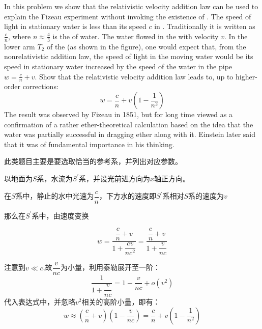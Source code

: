 \chapter[狭义相对论]{}
\begin{solution}
    In this problem we show that the relativistic velocity addition law can be used to
    explain the Fizeau experiment without invoking the existence of . The speed of light in stationary water is less than its speed $c$ in .
    Traditionally it is written as $\frac{c}{n}$, where $n\approx \frac{4}{3}$ is the  of water. The water flowed in the  with
    velocity $v$. In the lower arm $T_2$ of the  (as shown in the figure), one would expect that, from the nonrelativistic addition law, the
    speed of light in the moving water would be its speed in stationary
    water increased by the speed of the water in the pipe $w=\frac{c}{n}+v$. Show
    that the relativistic velocity addition law leads to, up to higher-order
    corrections:
    \begin{equation*}
        w=\frac cn+v\left(1-\frac1{n^2}\right)
    \end{equation*}
    The result was observed by Fizeau in 1851, but for long time viewed as
    a confirmation of a rather   ether-theoretical
    calculation based on the idea that the water was partially successful in
    dragging ether along with it. Einstein later said that it was of
    fundamental importance in his thinking.
    \begin{center}
    \end{center}

    \tcbrule

    此类题目主要是要选取恰当的参考系，并列出对应参数。

    以地面为$S$系，水流为$S^{\prime}$系，并设光前进方向为$x$轴正方向。

    在$S$系中，静止的水中光速为$\dfrac{c}{n}$，下方水的速度即$S^{\prime}$系相对$S$系的速度为$v$

    那么在$S^{\prime}$系中，由速度变换

    \[w=\dfrac{\dfrac{c}{n}+v}{1+\dfrac{cv}{nc^{2}}}=\dfrac{\dfrac{c}{n}+v}{1+\dfrac{v}{nc}}\]

    注意到$v\ll c$,故$\dfrac{v}{nc}$为小量，利用泰勒展开至一阶：
    \begin{equation*}
        \dfrac{1}{1+\dfrac{v}{nc}} = 1 - \dfrac{v}{nc} + o\left(v^{2}\right)
    \end{equation*}
    代入表达式中，并忽略$v^{2}$相关的高阶小量，即有：
    \[w\approx(\frac{c}{n}+v)(1-\frac{v}{nc})=\frac{c}{n}+v(1-\frac{1}{n^{2}})\]
\end{solution}
